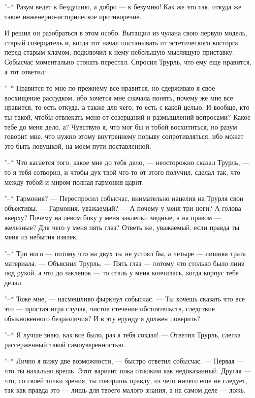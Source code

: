 "--* Разум ведет к бездушию, а добро --- к безумию! Как же
это так, откуда же такое инженерно-историческое
противоречие.

И решил он разобраться в этом особо. Вытащил из чулана
свою первую модель, старый созерцатель и, когда тот начал
постанывать от эстетического восторга перед старым хламом,
подключил к нему небольшую мыслящую приставку. Собысчас
моментально стонать перестал. Спросил Трурль, что ему еще
нравится, а тот ответил:

"--* Нравится то мне по-прежнему все нравится, но
сдерживаю я свое восхищение рассудком, ибо хочется мне
сначала понять, почему же мне все нравится, то есть откуда,
а также для чего, то есть с какой целью. И вообще, кто ты
такой, чтобы отвлекать меня от созерцаний и размышлений
вопросами? Какое тебе до меня дело, а? Чувствую я, что мог
бы и тобой восхититься, но разум говорит мне, что нужно
этому внутреннему порыву сопротивляться, ибо может это быть
ловушкой, на моем пути поставленной.

"--* Что касается того, какое мне до тебя дело, --- неосторожно
сказал Трурль, --- то я тебя сотворил, и чтобы
дух твой что-то от этого получил, сделал так, что между
тобой и миром полная гармония царит.

"--* Гармония? --- Переспросил собысчас, внимательно нацелив
на Трурля свои объективы. --- Гармония, уважаемый? --- А
почему у меня три ноги? А голова --- вверху? Почему на левом
боку у меня заклепки медные, а на правом --- железные? Для
чего у меня пять глаз? Ответь же, уважаемый, если правда ты
меня из небытия извлек.

"--* Три ноги --- потому что на двух ты не устоял бы, а
четыре --- лишняя трата материала. --- Объяснил Трурль. --- Пять
глаз --- потому что столько было линз под рукой, а что до
заклепок --- то сталь у меня кончилась, когда корпус тебе
делал.

"--* Тоже мне, --- насмешливо фыркнул собысчас. --- Ты хочешь
сказать что все это --- простая игра случая, чистое стечение
обстоятельств, следствие обыкновенного безразличия? И в эту
ерунду я должен поверить?

"--* Я лучше знаю, как все было, раз я тебя создал! --- Ответил
Трурль, слегка рассерженный такой самоуверенностью.

"--* Лично я вижу две возможности, --- быстро ответил
собысчас. --- Первая --- что ты нахально врешь. Этот вариант
пока отложим как недоказанный. Другая --- что, со своей точки
зрения, ты говоришь правду, из чего ничего еще не следует,
так как правда это --- лишь для твоего малого знания, а на
самом деле --- ложь.

